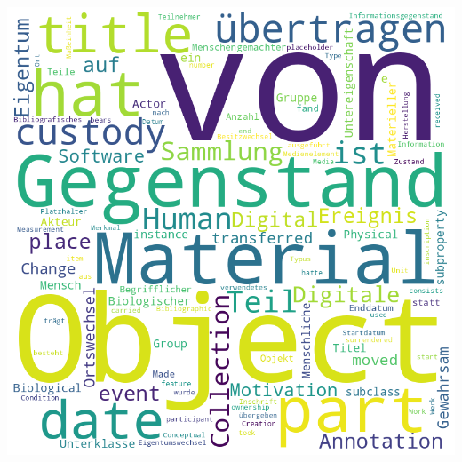 \documentclass[
  11pt,
  a4paper,
  openany]{book}
\begin{document}
\includegraphics{section_files/figure-pdf/cell-5-output-1.png}


\backmatter
\end{document}
